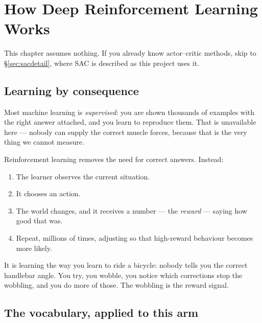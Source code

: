 \chapter{How Deep Reinforcement Learning Works}

This chapter assumes nothing. If you already know actor--critic methods, skip to
\S\ref{sec:sacdetail}, where SAC is described as this project uses it.

\section{Learning by consequence}

Most machine learning is \emph{supervised}: you are shown thousands of examples
with the right answer attached, and you learn to reproduce them. That is
unavailable here --- nobody can supply the correct muscle forces, because that is
the very thing we cannot measure.

Reinforcement learning removes the need for correct answers. Instead:

\begin{enumerate}[leftmargin=1.5em, itemsep=2pt]
\item The learner observes the current situation.
\item It chooses an action.
\item The world changes, and it receives a number --- the \emph{reward} --- saying
how good that was.
\item Repeat, millions of times, adjusting so that high-reward behaviour becomes
more likely.
\end{enumerate}

\begin{plain}
It is learning the way you learn to ride a bicycle: nobody tells you the correct
handlebar angle. You try, you wobble, you notice which corrections stop the
wobbling, and you do more of those. The wobbling is the reward signal.
\end{plain}

\section{The vocabulary, applied to this arm}

